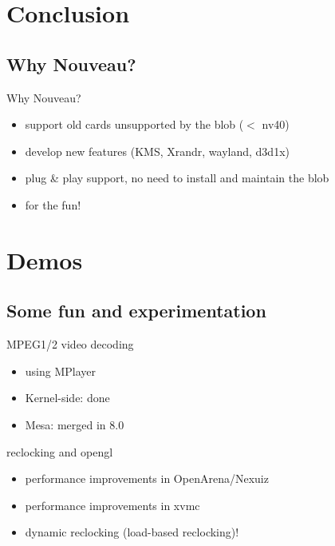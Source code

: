 \documentclass[11pt,english,compress]{beamer}
\begin{document}
\section{Conclusion}
	\subsection*{Why Nouveau?}
		\begin{frame}
			\begin{block}{Why Nouveau?}
				\begin{itemize}
					\item support old cards unsupported by the blob ($<$ nv40)
					\item develop new features (KMS, Xrandr, wayland, d3d1x)
					\item plug \& play support, no need to install and maintain the blob
					\item for the fun!
				\end{itemize}
			\end{block}
		\end{frame}

\section{Demos}
	\subsection*{Some fun and experimentation}
		\begin{frame}
			\begin{block}{MPEG1/2 video decoding}
				\begin{itemize}
					\item using MPlayer
					\item Kernel-side: done
					\item Mesa: merged in 8.0
				\end{itemize}
			\end{block}

			\begin{block}{reclocking and opengl}
				\begin{itemize}
					\item performance improvements in OpenArena/Nexuiz
					\item performance improvements in xvmc
					\item dynamic reclocking (load-based reclocking)!
				\end{itemize}
			\end{block}
		\end{frame}
\end{document}
